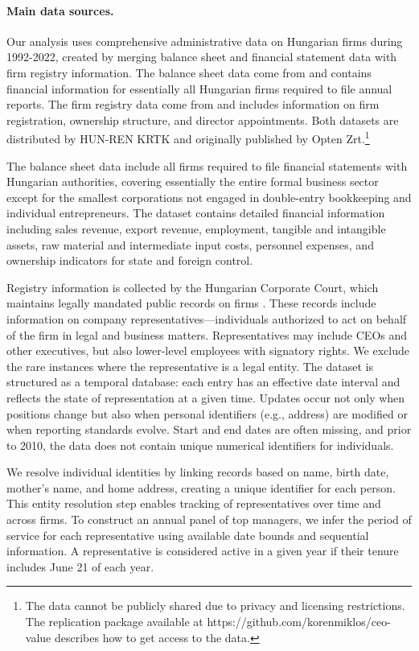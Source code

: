 \documentclass[11pt,a4paper]{article}
\begin{document}
\paragraph{Main data sources.} Our analysis uses comprehensive administrative data on Hungarian firms during 1992-2022, created by merging balance sheet and financial statement data with firm registry information. The balance sheet data come from \citet{merleg2024} and contains financial information for essentially all Hungarian firms required to file annual reports. The firm registry data come from \citet{cegjegyzek2024} and includes information on firm registration, ownership structure, and director appointments. Both datasets are distributed by HUN-REN KRTK and originally published by Opten Zrt.\footnote{The data cannot be publicly shared due to privacy and licensing restrictions. The replication package available at https://github.com/korenmiklos/ceo-value describes how to get access to the data.}

The balance sheet data include all firms required to file financial statements with Hungarian authorities, covering essentially the entire formal business sector except for the smallest corporations not engaged in double-entry bookkeeping and individual entrepreneurs. The dataset contains detailed financial information including sales revenue, export revenue, employment, tangible and intangible assets, raw material and intermediate input costs, personnel expenses, and ownership indicators for state and foreign control.

Registry information is collected by the Hungarian Corporate Court, which maintains legally mandated public records on firms \citep{cegtv}. These records include information on company representatives---individuals authorized to act on behalf of the firm in legal and business matters. Representatives may include CEOs and other executives, but also lower-level employees with signatory rights. We exclude the rare instances where the representative is a legal entity. The dataset is structured as a temporal database: each entry has an effective date interval and reflects the state of representation at a given time. Updates occur not only when positions change but also when personal identifiers (e.g., address) are modified or when reporting standards evolve. Start and end dates are often missing, and prior to 2010, the data does not contain unique numerical identifiers for individuals.

We resolve individual identities by linking records based on name, birth date, mother's name, and home address, creating a unique identifier for each person. This entity resolution step enables tracking of representatives over time and across firms. To construct an annual panel of top managers, we infer the period of service for each representative using available date bounds and sequential information. A representative is considered active in a given year if their tenure includes June 21 of each year.
\end{document}
